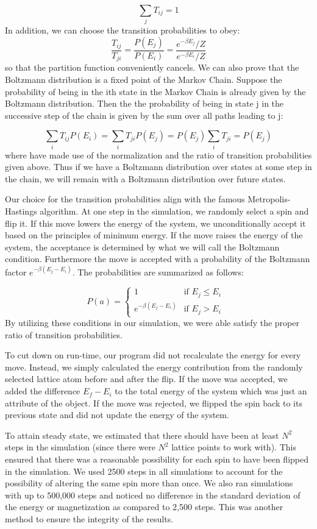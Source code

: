 \documentclass[11pt]{article}
\begin{document}
\[\sum_j T_{ij} = 1\]
In addition, we can choose the transition probabilities to obey: 
\[\frac{T_{ij}}{T_{ji}} = \frac{P(E_j)}{P(E_{i})} = \frac{e^{-\beta E_j}/Z}{e^{-\beta E_i}/Z}\]
so that the partition function conveniently cancels. We can also prove that the Boltzmann distribution is a fixed point of the Markov Chain. Suppose the probability of being in the ith state in the Markov Chain is already given by the Boltzmann distribution. Then the the probability of being in state j in the successive step of the chain is given by the sum over all paths leading to j:

\[\sum_i T_{ij} P(E_i) = \sum_i T_{ji}P(E_j) = P(E_j)\sum_i T_{ji} = P(E_j)\]
where have made use of the normalization and the ratio of transition probabilities given above. Thus if we have a Boltzmann distribution over states at some step in the chain, we will remain with a Boltzmann distribution over future states.

Our choice for the transition probabilities align with the famous Metropolis-Hastings algorithm. At one step in the simulation, we randomly select a spin and flip it. If this move lowers the energy of the system, we unconditionally accept it based on the principles of minimum energy. If the move raises the energy of the system, the acceptance is determined by what we will call the Boltzmann condition. Furthermore the move is accepted with a probability of the Boltzmann factor $e^{-\beta(E_j - E_i)}$. The probabilities are summarized as follows:

\[P(a) = 
\begin{cases}
1 & \text{if $E_j \leq E_i$ }\\
e^{-\beta(E_j - E_i)} & \text{if $E_j > E_i$}
\end{cases}
\]
By utilizing these conditions in our simulation, we were able satisfy the proper ratio of transition probabilities.

To cut down on run-time, our program did not recalculate the energy for every move. Instead, we simply calculated the energy contribution from the randomly selected lattice atom before and after the flip. If the move was accepted, we added the difference $E_f - E_i$ to the total energy of the system which was just an attribute of the object. If the move was rejected, we flipped the spin back to its previous state and did not update the energy of the system.

To attain steady state, we estimated that there should have been at least $N^2$ steps in the simulation (since there were $N^2$ lattice points to work with). This ensured that there was a reasonable possibility for each spin to have been flipped in the simulation. We used 2500 steps in all simulations to account for the possibility of altering the same spin more than once. We also ran simulations with up to 500,000 steps and noticed no difference in the standard deviation of the energy or magnetization as compared to 2,500 steps. This was another method to ensure the integrity of the results.
\end{document}
